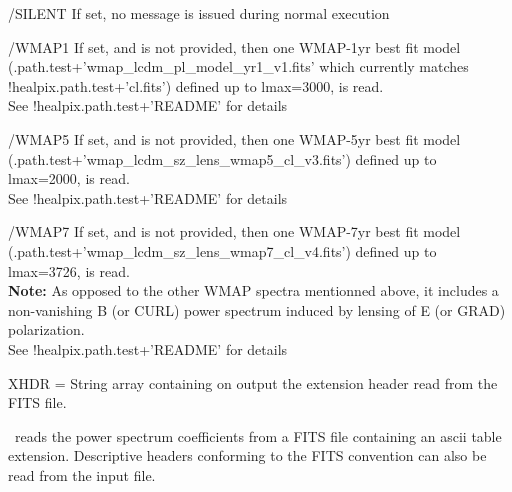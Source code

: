 \begin{keywords}
\begin{kwlist}{}
    \item[/SILENT] %
	If set, no message is issued during normal execution
%
    \item[/WMAP1] %
           If set, and  
           is not provided, then one WMAP-1yr best fit
          model
(.path.test+\-'wmap\_lcdm\_pl\_model\_yr1\_v1.fits'
which currently matches !healpix.path.test+'cl.fits') 
          defined up to lmax=3000, is read.\\
          See !healpix.path.test+'README' for details
%
    \item[/WMAP5] %
           If set, and 
           is not provided, then one WMAP-5yr best fit
          model (.path.test+\-'wmap\_lcdm\_sz\_lens\_wmap5\_cl\_v3.fits') 
          defined up to lmax=2000, is read.\\
          See !healpix.path.test+'README' for details
%
    \item[/WMAP7] %
           If set, and 
           is not provided, then one WMAP-7yr best fit
          model (.path.test+\-'wmap\_lcdm\_sz\_lens\_wmap7\_cl\_v4.fits') 
          defined up to lmax=3726, is read.\\
          {\bf Note:} As opposed to the other WMAP spectra mentionned above, it includes
             a non-vanishing B (or CURL) power spectrum 
             induced by lensing of E (or GRAD) polarization.\\
          See !healpix.path.test+'README' for details
%
    \item[XHDR =] %
	String array containing on output the extension header
      read from the FITS file. 
  \end{kwlist}
\end{keywords}  

\begin{codedescription}
{\thedocid\ reads the power spectrum coefficients from a FITS
file containing an ascii table extension. Descriptive headers conforming
to the FITS convention can also be read from the input file.
}
\end{codedescription}



